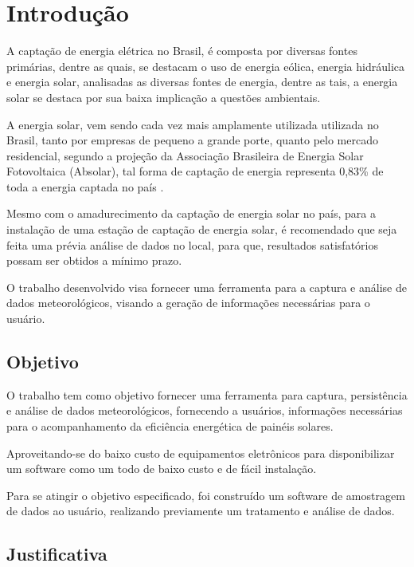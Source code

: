 \nocite{ddd_eric_evans}
\nocite{gof_patterns}
\nocite{sonda_project}
\nocite{nosql_distilled}
\nocite{js_async}

\chapter{Introdução}

A captação de energia elétrica no Brasil, é composta por diversas fontes primárias, dentre as quais, se destacam o uso de energia eólica, energia hidráulica e energia solar, analisadas as diversas fontes de energia, dentre as tais, a energia solar se destaca por sua baixa implicação a questões ambientais.

A energia solar, vem sendo cada vez mais amplamente utilizada utilizada no Brasil, tanto por empresas de pequeno a grande porte, quanto pelo mercado residencial, segundo a projeção da Associação Brasileira de Energia Solar Fotovoltaica (Absolar), tal forma de captação de energia representa 0,83\% de toda a energia captada no país \cite{maturidade_absolar}.

Mesmo com o amadurecimento da captação de energia solar no país, para a instalação de uma estação de captação de energia solar, é recomendado que seja feita uma prévia análise de dados no local, para que, resultados satisfatórios possam ser obtidos a mínimo prazo.

O trabalho desenvolvido visa fornecer uma ferramenta para a captura e análise de dados meteorológicos, visando a geração de informações necessárias para o usuário.

\section{Objetivo}

O trabalho tem como objetivo fornecer uma ferramenta para captura, persistência e análise de dados meteorológicos, fornecendo a usuários, informações necessárias para o acompanhamento da eficiência energética de painéis solares.

Aproveitando-se do baixo custo de equipamentos eletrônicos para disponibilizar um software como um todo de baixo custo e de fácil instalação.

Para se atingir o objetivo especificado, foi construído um software de amostragem de dados ao usuário, realizando previamente um tratamento e análise de dados.

\section{Justificativa}

